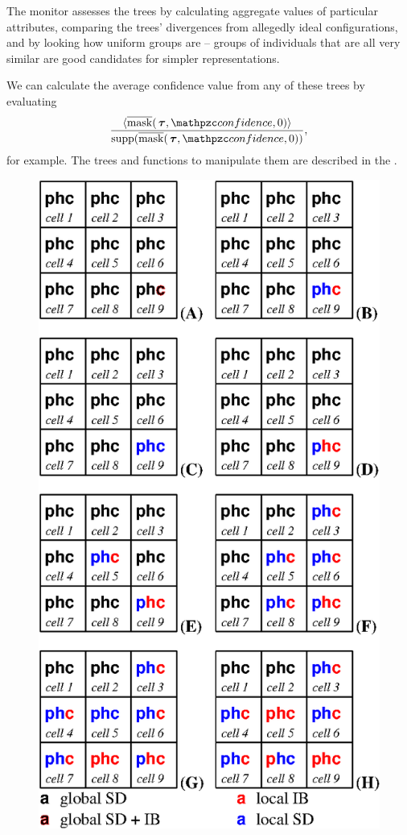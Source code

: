 The monitor assesses the trees by calculating aggregate values of
particular attributes, comparing the trees' divergences from allegedly
ideal con\-fig\-ur\-a\-tions, and by looking how uniform groups are -- groups
of in\-di\-vidu\-als that are all very similar are good candidates for
simpler rep\-re\-sen\-ta\-tions. 

We can calculate the average confidence value from any of these trees
by evaluating \[
\frac{\nabs{\nmask(\node{\tau},
    \mc{confidence},0)}}{\supp(\nmask(\node{\tau},
  \mc{confidence},0))},
\]
for example. The trees and functions to manipulate them are described
in the \appendixname.



\begin{figure}
\begin{center}
  \includegraphics{Figure3}

\end{center}
\end{figure}
